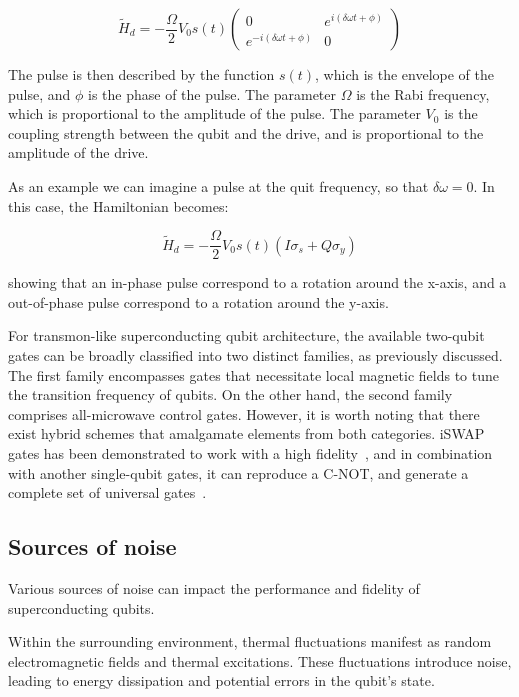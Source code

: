 \documentclass[
  journal=largetwo,
  year=2023,
]{cup-journal}
\begin{document}
\begin{equation}
  \tilde H_d = -\frac{\Omega}{2}V_0 s(t) \begin{pmatrix}
    0                             & e^{i(\delta\omega t + \phi)} \\
    e^{-i(\delta\omega t + \phi)} & 0
  \end{pmatrix}
\end{equation}

The pulse is then described by the function \(s(t)\), which is the envelope of the pulse, and \(\phi\) is the phase of the pulse. The parameter \(\Omega\) is the Rabi frequency, which is proportional to the amplitude of the pulse. The parameter \(V_0\) is the coupling strength between the qubit and the drive, and is proportional to the amplitude of the drive.

As an example we can imagine a pulse at the quit frequency, so that \(\delta\omega = 0\). In this case, the Hamiltonian becomes:

\begin{equation}
  \tilde H_d = - \frac{\Omega}{2}V_0 s(t)(I\sigma_s+Q\sigma_y)
\end{equation}

\noindent showing that an in-phase pulse correspond to a rotation around the x-axis, and a out-of-phase pulse correspond to a rotation around the y-axis.

For transmon-like superconducting qubit architecture, the available two-qubit gates can be broadly classified into two distinct families, as previously discussed. The first family encompasses gates that necessitate local magnetic fields to tune the transition frequency of qubits. On the other hand, the second family comprises all-microwave control gates. However, it is worth noting that there exist hybrid schemes that amalgamate elements from both categories.
iSWAP gates has been demonstrated to work with a high fidelity~\autocite{sung_2021_realization}, and in combination with another single-qubit gates, it can reproduce a C-NOT, and generate a complete set of universal gates~\autocite{krantz_2019_a}.

\subsection{Sources of noise}
Various sources of noise can impact the performance and fidelity of superconducting qubits.

Within the surrounding environment, thermal fluctuations manifest as random electromagnetic fields and thermal excitations. These fluctuations introduce noise, leading to energy dissipation and potential errors in the qubit's state.
\end{document}
